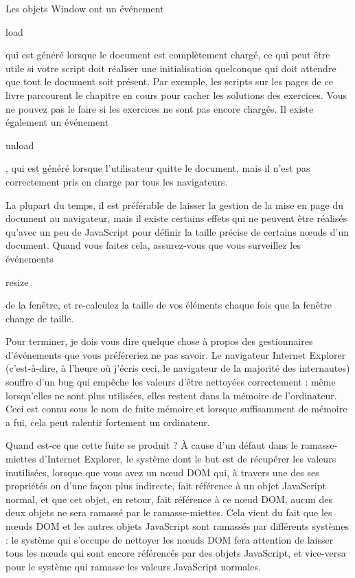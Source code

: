 \documentclass{FramateX}
\renewcommand{\texttt}[1]{\begin{sffamily}{#1}\end{sffamily}}
\begin{document}
Les objets Window ont un événement \texttt{load} qui est généré lorsque
le document est complètement chargé, ce qui peut être utile si votre
script doit réaliser une initialisation quelconque qui doit attendre que
tout le document soit présent. Par exemple, les scripts sur les pages de
ce livre parcourent le chapitre en cours pour cacher les solutions des
exercices. Vous ne pouvez pas le faire si les exercices ne sont pas
encore chargés. Il existe également un événement \texttt{unload}, qui
est généré lorsque l'utilisateur quitte le document, mais il n'est pas
correctement pris en charge par tous les navigateurs.

La plupart du temps, il est préférable de laisser la gestion de la mise
en page du document au navigateur, mais il existe certains effets qui ne
peuvent être réalisés qu'avec un peu de JavaScript pour définir la
taille précise de certains nœuds d'un document. Quand vous faites cela,
assurez-vous que vous surveillez les événements \texttt{resize} de la
fenêtre, et re-calculez la taille de vos éléments chaque fois que la
fenêtre change de taille.

\begin{center}\end{center}

Pour terminer, je dois vous dire quelque chose à propos des
gestionnaires d'événements que vous préféreriez ne pas savoir. Le
navigateur Internet Explorer (c'est-à-dire, à l'heure où j'écris ceci,
le navigateur de la majorité des internautes) souffre d'un bug qui
empêche les valeurs d'être nettoyées correctement : même lorsqu'elles ne
sont plus utilisées, elles restent dans la mémoire de l'ordinateur. Ceci
est connu sous le nom de fuite mémoire et lorsque suffisamment de
mémoire a fui, cela peut ralentir fortement un ordinateur.

Quand est-ce que cette fuite se produit ? À cause d'un défaut dans le
ramasse-miettes d'Internet Explorer, le système dont le but est de
récupérer les valeurs inutilisées, lorsque que vous avez un nœud DOM
qui, à travers une des ses propriétés ou d'une façon plus indirecte,
fait référence à un objet JavaScript normal, et que cet objet, en
retour, fait référence à ce nœud DOM, aucun des deux objets ne sera
ramassé par le ramasse-miettes. Cela vient du fait que les nœuds DOM et
les autres objets JavaScript sont ramassés par différents systèmes : le
système qui s'occupe de nettoyer les nœuds DOM fera attention de laisser
tous les nœuds qui sont encore référencés par des objets JavaScript, et
vice-versa pour le système qui ramasse les valeurs JavaScript normales.
\end{document}

